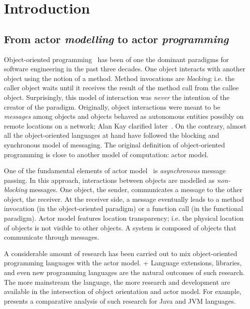 
\chapter[Introduction]{Introduction}
\label{ch:intro}

\section{From actor \emph{modelling} to actor \emph{programming}}
\label{sec:intro:abs}

Object-oriented programming~\cite{booch1982object,meyer1988object} has been of one the dominant paradigms for software engineering in the past three decades.
One object interacts with another object using the notion of a method.
Method invocations are \emph{blocking}; i.e. the caller object waits until it receives the result of the method call from the callee object.
Surprisingly, this model of interaction was \emph{never} the intention of the creator of the paradigm.
Originally, object interactions were meant to be \emph{messages} among objects and objects behaved as autonomous entities possibly on remote locations on a network; Alan Kay clarified later~\cite{alank1,alank2}. 
On the contrary, almost all the object-oriented languages at hand have followed the blocking and synchronous model of messaging. 
The original definition of object-oriented programming is close to another model of computation: actor model.  

One of the fundamental elements of actor model~\cite{actors:agha,agha97} is \emph{asynchronous} message passing.
In this approach, interactions between objects are modelled as \emph{non-blocking} messages.
One object, the sender, communicates a message to the other object, the receiver.
At the receiver side, a message eventually leads to a method invocation (in the object-oriented paradigm) or a function call (in the functional paradigm).
Actor model features location transparency; i.e. the physical location of objects is not visible to other objects.
A system is composed of objects that communicate through messages.

A considerable amount of research has been carried out to mix object-oriented programming languages with the actor model. 
+
Language extensions, libraries, and even new programming languages are the natural outcomes of such research.
The more mainstream the language, the more research and development are available in the intersection of object orientation and actor model.
For example, \cite{actor_frameworks_jvm:agha} presents a comparative analysis of such research for Java and JVM languages.

